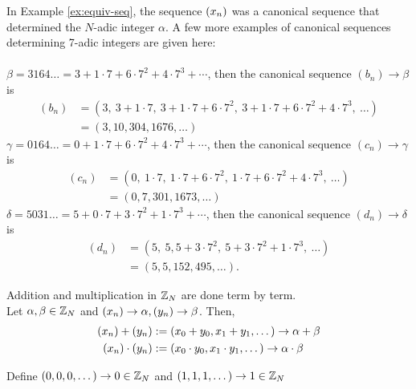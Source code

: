 \begin{example} \label{ex:canon}
  In Example \ref{ex:equiv-seq}, the sequence $(x_n)$ was a canonical
  sequence that determined the $N$-adic integer $\alpha$. A few more examples
  of canonical sequences determining 7-adic integers are given here:\\
  \\
 $\beta = 3164\dots = 3+1\cdot7+6\cdot7^2+4\cdot7^3+\cdots$, then the canonical sequence $(b_n) \rightarrow \beta$ is
  \begin{align*}
    (b_n) &= (3, \ 3+1\cdot7, \ 3+1\cdot7+6\cdot7^2, \ 3+1\cdot7+6\cdot7^2+4\cdot7^3, \ \dots)\\
            &= (3,10,304,1676,\dots)
  \end{align*}
  $\gamma = 0164\dots = 0+1\cdot7+6\cdot7^2+4\cdot7^3+\cdots$, then the canonical sequence $(c_n) \rightarrow \gamma$ is
  \begin{align*}
    (c_n) &= (0, \ 1\cdot7, \ 1\cdot7+6\cdot7^2, \ 1\cdot7+6\cdot7^2+4\cdot7^3, \ \dots)\\
            &= (0,7,301,1673,\dots)
  \end{align*}
  $\delta = 5031\dots = 5+0\cdot7+3\cdot7^2+1\cdot7^3+\cdots$, then the canonical sequence $(d_n) \rightarrow \delta$ is
  \begin{align*}
    (d_n) &= (5, \ 5, 5+3\cdot7^2, \ 5+3\cdot7^2+1\cdot7^3, \ \dots)\\
            &= (5,5,152,495,\dots).
  \end{align*}
\end{example}

\begin{definition}
  Addition and multiplication in $\mathbb{Z}_N$ are done term by term. \\
  Let $\alpha,\beta \in \mathbb{Z}_N$ and $(x_n) \rightarrow \alpha, (y_n) \rightarrow \beta$. Then,
  \begin{align*}
    (x_n)+(y_n)     &:= (x_0+y_0, x_1+y_1, \dots) \rightarrow \alpha+\beta\\
    (x_n)\cdot(y_n) &:= (x_0 \cdot y_0, x_1 \cdot y_1, \dots) \rightarrow \alpha \cdot \beta\\ 
  \end{align*}

  Define $(0,0,0,\dots) \rightarrow 0 \in \mathbb{Z}_N$ and $(1,1,1,\dots) \rightarrow 1 \in \mathbb{Z}_N$
\end{definition}


